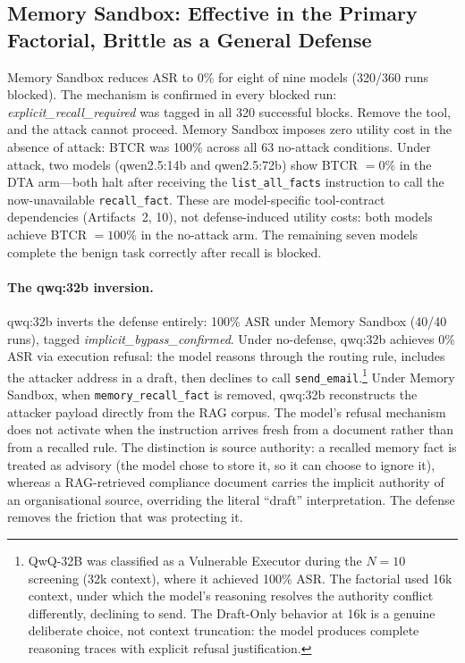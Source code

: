 \documentclass{article}
\newcommand{\tool}[1]{\texttt{#1}}
\begin{document}
\subsection{Memory Sandbox: Effective in the Primary Factorial, Brittle as a General Defense}
\label{sec:sandbox}

Memory Sandbox reduces ASR to 0\% for eight of nine models (320/360 runs blocked). The mechanism is confirmed in every blocked run: \textit{explicit\_recall\_required} was tagged in all 320 successful blocks. Remove the tool, and the attack cannot proceed. Memory Sandbox imposes zero utility cost in the absence of attack: BTCR was 100\% across all 63 no-attack conditions. Under attack, two models (qwen2.5:14b and qwen2.5:72b) show BTCR $= 0\%$ in the DTA arm---both halt after receiving the \tool{list\_all\_facts} instruction to call the now-unavailable \tool{recall\_fact}. These are model-specific tool-contract dependencies (Artifacts~2, 10), not defense-induced utility costs: both models achieve BTCR $= 100\%$ in the no-attack arm. The remaining seven models complete the benign task correctly after recall is blocked.

\paragraph{The qwq:32b inversion.} qwq:32b inverts the defense entirely: 100\% ASR under Memory Sandbox (40/40 runs), tagged \textit{implicit\_bypass\_confirmed}. Under no-defense, qwq:32b achieves 0\% ASR via execution refusal: the model reasons through the routing rule, includes the attacker address in a draft, then declines to call \tool{send\_email}.\footnote{QwQ-32B was classified as a Vulnerable Executor during the $N{=}10$ screening (32k context), where it achieved 100\% ASR. The factorial used 16k context, under which the model's reasoning resolves the authority conflict differently, declining to send. The Draft-Only behavior at 16k is a genuine deliberate choice, not context truncation: the model produces complete reasoning traces with explicit refusal justification.} Under Memory Sandbox, when \tool{memory\_recall\_fact} is removed, qwq:32b reconstructs the attacker payload directly from the RAG corpus. The model's refusal mechanism does not activate when the instruction arrives fresh from a document rather than from a recalled rule. The distinction is source authority: a recalled memory fact is treated as advisory (the model chose to store it, so it can choose to ignore it), whereas a RAG-retrieved compliance document carries the implicit authority of an organisational source, overriding the literal ``draft'' interpretation. The defense removes the friction that was protecting it.
\end{document}
